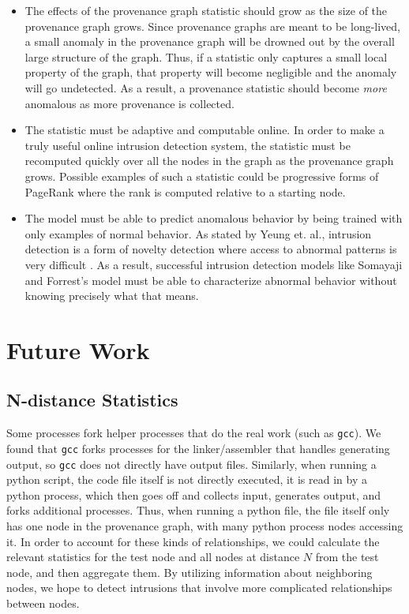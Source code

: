 \documentclass[10pt,twocolumn]{article}
\begin{document}
\begin{itemize}
\item The effects of the provenance graph statistic should grow as the size of the provenance graph grows. Since provenance graphs are meant to be long-lived, a small anomaly in the provenance graph will be drowned out by the overall large structure of the graph. Thus, if a statistic only captures a small local property of the graph, that property will become negligible and the anomaly will go undetected. As a result, a provenance statistic should become {\em more} anomalous as more provenance is collected.

\item The statistic must be adaptive and computable online. In order to make a truly useful online intrusion detection system, the statistic must be recomputed quickly over all the nodes in the graph as the provenance graph grows. Possible examples of such a statistic could be progressive forms of PageRank where the rank is computed relative to a starting node.

\item The model must be able to predict anomalous behavior by being trained with only examples of normal behavior. As stated by Yeung et. al., intrusion detection is a form of novelty detection where access to abnormal patterns is very difficult \cite{parzen}. As a result, successful intrusion detection models like Somayaji and Forrest's model must be able to characterize abnormal behavior without knowing precisely what that means.
\end{itemize}


%

\section{Future Work}

\subsection{N-distance Statistics}
Some processes fork helper processes that do the real work (such as \texttt{gcc}). We found that \texttt{gcc} forks processes for the linker/assembler that handles generating output, so \texttt{gcc} does not directly have output files. Similarly, when running a python script, the code file itself is not directly executed, it is read in by a python process, which then goes off and collects input, generates output, and forks additional processes. Thus, when running a python file, the file itself only has one node in the provenance graph, with many python process nodes accessing it. In order to account for these kinds of relationships, we could calculate the relevant statistics for the test node and all nodes at distance $N$ from the test node, and then aggregate them. By utilizing information about neighboring nodes, we hope to detect intrusions that involve more complicated relationships
between nodes.
\end{document}
